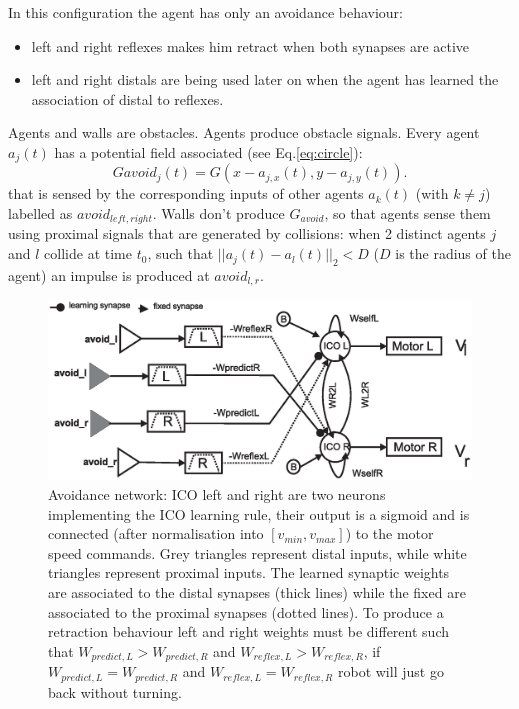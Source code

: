 In this configuration the agent has only an avoidance behaviour:
\begin{itemize}
\item left and right reflexes makes him retract when both synapses are active
\item left and right distals are being used later on when the agent has learned
the association of distal to reflexes.
\end{itemize}

Agents and walls are obstacles. Agents produce obstacle signals.
Every agent $a_{j}(t)$ has a potential field associated (see Eq.\ref{eq:circle}):
\begin{equation}
Gavoid_{j}(t)=G(x-a_{j,x}(t),y-a_{j,y}(t)).
\end{equation}
that is sensed by the corresponding inputs of other agents $a_{k}(t)$
(with $k\neq j$) labelled as $avoid_{left,right}$. Walls
don't produce $G_{avoid}$, so that agents sense them using proximal signals that are
generated by collisions: when 2 distinct agents $j$ and $l$ collide at time $t_{0}$, such
that $||a_{j}(t)-a_{l}(t)||_{2}<D$ ($D$ is the radius of the
agent) an impulse is produced at $avoid_{l,r}$.
\begin{figure}[htb]
\begin{center}
\includegraphics[scale=0.45]{figures/infomeasure/avoidance.eps}
\end{center}
\vspace*{4pt}
\small{
\caption[Avoidance ICO behaviour]{
Avoidance network: ICO left and right are two neurons implementing the
ICO learning rule, their output is a sigmoid and is connected (after
normalisation into $[v_{min},v_{max}]$) to the motor speed commands.
Grey triangles represent distal inputs, while white triangles represent
proximal inputs. The learned synaptic weights are associated to the distal
synapses (thick lines) while the fixed are associated to the proximal synapses
(dotted lines). To produce a retraction behaviour left and right weights
must be different such that
$W_{predict,L}>W_{predict,R}$ and $W_{reflex,L}>W_{reflex,R}$, if
$W_{predict,L}=W_{predict,R}$ and $W_{reflex,L}=W_{reflex,R}$ robot
will just go back without turning.\label{fig:inputcorr:avoidance}}}
\end{figure}
